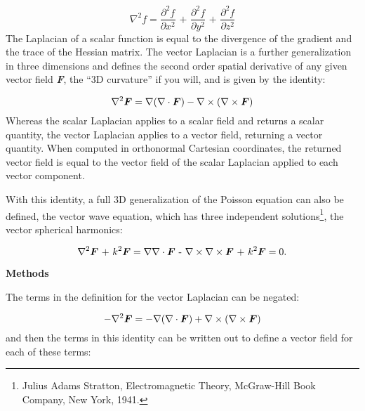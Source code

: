 \documentclass[a4paper]{article}
\newcommand\textstyleNone[1]{#1}
\newcounter{Text}
\newcommand\boldsubformula[1]{\text{\mathversion{bold}$#1$}}
\begin{document}
\begin{equation}
\nabla ^2f=\frac{\partial ^2f}{\partial x^2}\text{ + }\frac{\partial ^2f}{\partial y^2}\text{ + }\frac{\partial
^2f}{\partial z^2}
\end{equation}
{
\textstyleNone{The Laplacian of a scalar function is equal to the divergence of the gradient and the trace of the
Hessian matrix. The vector Laplacian is a further generalization in three dimensions and defines the second order
spatial derivative of any given vector field \textbf{\textit{F}}, the ``3D curvature'' if you will, and is given by the
identity:}}

\begin{equation}
\nabla ^2\boldsubformula F=\nabla (\nabla \cdot \boldsubformula F)-\nabla \times (\nabla \times \boldsubformula F)
\end{equation}
{
\textstyleNone{Whereas the scalar Laplacian applies to a scalar field and returns a scalar quantity, the vector
Laplacian applies to a vector field, returning a vector quantity. When computed in orthonormal Cartesian coordinates,
the returned vector field is equal to the vector field of the scalar Laplacian applied to each vector component. }}

{
\textstyleNone{With this identity, a full 3D generalization of the Poisson equation can also be defined, }the vector
wave equation, which has three independent solutions\footnote{ Julius Adams Stratton, Electromagnetic Theory,
McGraw-Hill Book Company, New York, 1941.\par  }, the vector spherical harmonics:}

\begin{equation}\label{seq:refText3}
{\nabla}^2\boldsubformula F\text{ + }k^2\boldsubformula F=\nabla \nabla \cdot \boldsubformula F\text{ - }\nabla \times
\nabla \times \boldsubformula F\text{ + }k^2\boldsubformula F=0.
\end{equation}
{\centering
\textstyleNone{\textbf{{Methods}}}
\par}

{
\textstyleNone{The terms in the definition for the vector Laplacian can be negated:}}

\begin{equation}
-\nabla ^2\boldsubformula F=-\nabla (\nabla \cdot \boldsubformula F)+\nabla \times (\nabla \times \boldsubformula F)
\end{equation}
{
\textstyleNone{and then the terms in this identity can be written out to define a vector field for each of these terms: 
}}
\end{document}
